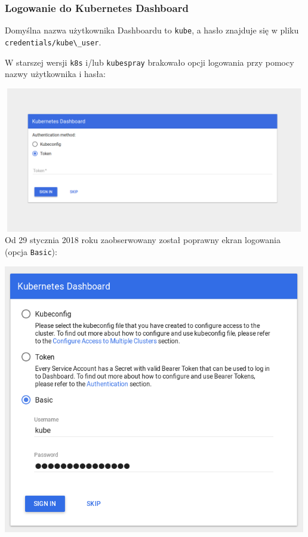 \documentclass[a4paper,12pt,twoside,openany]{report}
\newcommand{\passthrough}[1]{#1}
\begin{document}
\hypertarget{logowanie-do-kubernetes-dashboard}{%
\subsubsection{Logowanie do Kubernetes
Dashboard}\label{logowanie-do-kubernetes-dashboard}}

Domyślna nazwa użytkownika Dashboardu to \passthrough{\lstinline!kube!},
a hasło znajduje się w pliku
\passthrough{\lstinline!credentials/kube\_user!}.

W starszej wersji \passthrough{\lstinline!k8s!} i/lub
\passthrough{\lstinline!kubespray!} brakowało opcji logowania przy
pomocy nazwy użytkownika i hasła:

\includegraphics[width=5.20833in,height=2.5in]{assets/dashboard-login-old.png}\\

Od 29 stycznia 2018 roku zaobserwowany został poprawny ekran logowania
(opcja \passthrough{\lstinline!Basic!}):

\includegraphics[width=5.20833in,height=4.63542in]{assets/dashboard-login-new.png}\\
\end{document}
